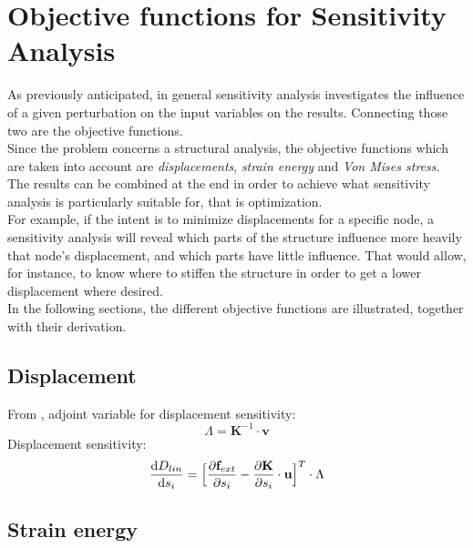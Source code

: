 
\section{Objective functions for Sensitivity Analysis}
As previously anticipated, in general sensitivity analysis investigates the influence of a given perturbation on the input variables on the results. Connecting those two are the objective functions. \\[6pt]
Since the problem concerns a structural analysis, the objective functions which are taken into account are \textit{displacements}, \textit{strain energy} and \textit{Von Mises stress}.\\
The results can be combined at the end in order to achieve what sensitivity analysis is particularly suitable for, that is optimization. \\[6pt]
For example, if the intent is to minimize displacements for a specific node, a sensitivity analysis will reveal which parts of the structure influence more heavily that node's displacement, and which parts have little influence. That would allow, for instance, to know where to stiffen the structure in order to get a lower displacement where desired. \\[6pt]
In the following sections, the different objective functions are illustrated, together with their derivation.

\subsection{Displacement}

From \cite{masching_dissertation}, adjoint variable for displacement sensitivity:
\begin{equation}
\Lambda = \textbf{K}^{-1}\cdot\textbf{v}
\label{}
\end{equation}
Displacement sensitivity: 
\begin{equation}
\dv{D_{lin}}{s_i} = \Big[\pdv{\textbf{f}_{ext}}{s_i} - \pdv{\textbf{K}}{s_i} \cdot\textbf{u}\Big]^T \cdot \Lambda
\label{}
\end{equation}

\subsection{Strain energy}

